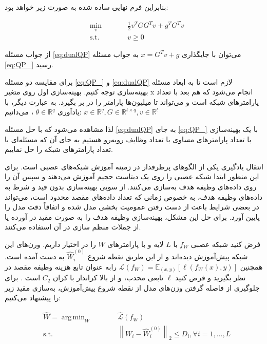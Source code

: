 \documentclass{article}
\DeclareMathOperator*{\argmin}{arg\,min}
\begin{document}
بنابراین فرم نهایی ساده شده به صورت زیر خواهد بود:

\begin{subequations}\label{eq:dualQP}
\begin{alignat}{2}
&\!\min_{v}        &\qquad& \frac{1}{2} v^TGG^Tv+g^TG^Tv\\
&\text{s.t.} &      & v \geq 0
\end{alignat}
\end{subequations}

از جواب مسئله 
\ref{eq:dualQP}
می‌توان با جایگذاری
$x = G^Tv+g$
به جواب مسئله 
\ref{eq:QP_}
رسید.

برای مقایسه
دو مسئله
\ref{eq:QP_}
و
\ref{eq:dualQP}
لازم است تا به ابعاد مسئله بهینه‌سازی توجه کنیم.
بهینه‌سازی اول روی متغیر 
x
انجام می‌شود که هم بعد با تعداد پارامترهای شبکه است و می‌تواند تا میلیون‌ها پارامتر را در بر بگیرد.
به عبارت دیگر، با یادآوری 
$\theta \in \mathbb{R}^q$
،
می‌دانیم:
$x \in \mathbb{R}^q, G \in \mathbb{R}^{t\times q}, v \in \mathbb{R}^t$

لذا مشاهده می‌شود که با حل مسئله
\ref{eq:dualQP}
به جای 
\ref{eq:QP_}
با یک بهینه‌سازی با تعداد پارامتر‌های مساوی با تعداد وظایف روبه‌رو هستیم به جای آن که مسئله‌ای با تعداد پارامترهای شبکه را حل نماییم.

\fi

انتقال یادگیری
یکی از الگوهای پرطرفدار در زمینه آموزش شبکه‌های عصبی است. برای این منظور ابتدا شبکه عصبی را روی یک دیتاست حجیم آموزش می‌دهند و سپس 
آن را روی داده‌های وظیفه هدف به‌سازی 
می‌کنند.
از سویی
بهینه‌سازی بدون قید و شرط به داده‌های وظیفه هدف، به خصوص زمانی که تعداد داده‌های مقصد محدود است، می‌تواند در بعضی شرایط باعث
از دست رفتن عمومیت بخشی 
مدل شده و اتفاقاً دقت مدل را پایین آورد.
برای حل این مشکل، بهینه‌سازی وظیفه هدف را به صورت 
مقید در آورده یا از جملات منظم سازی در آن استفاده می‌کنند.

فرض کنید شبکه عصبی 
$f_W$
با
$L$
لایه و 
با پارامترهای 
$W$
را در اختیار داریم. 
ورن‌های این شبکه پیش‌آموزش دیده‌اند و از این طریق نقطه شروع 
$\hat{W}_i^{(0)}$
به دست آمده است.
همچنین 
$\mathcal{L}(f_W) = \mathbb{E}_{(x,y)}[\ell(f_W(x),y)]$
رابه عنوان تابع هزینه وظیفه مقصد در نظر بگیرید
و فرض کنید 
$\ell$
تابعی 
محدب،
و از بالا کراندار با کران 
$C_2$
است
.
برای جلوگیری از فاصله گرفتن وزن‌های مدل از نقطه شروع پیش‌آموزش،
 به‌سازی مقید زیر را پیشنهاد می‌کنیم:

\begin{subequations}
\begin{alignat}{2}
&\!\hat{W} = \argmin_{W}       &\qquad&  \mathcal{\hat{L}}(f_W)\\
&\text{s.t.} &      & {\left\lVert W_i - \hat{W}_i^{(0)}\right\rVert}_2 \leq D_i, \forall  i = 1,...,L
\end{alignat}
\end{subequations}
\end{document}
